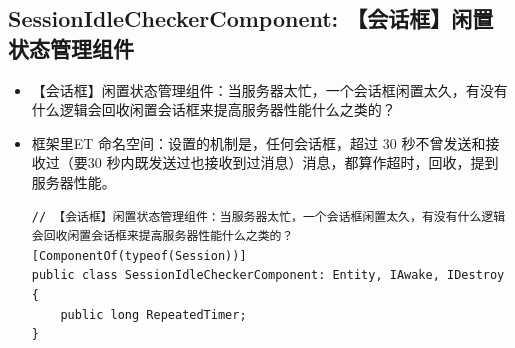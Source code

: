 \documentclass[9pt, b5paper]{article}
\begin{document}
\subsection{SessionIdleCheckerComponent: 【会话框】闲置状态管理组件}
\label{sec-3-16}
\begin{itemize}
\item 【会话框】闲置状态管理组件：当服务器太忙，一个会话框闲置太久，有没有什么逻辑会回收闲置会话框来提高服务器性能什么之类的？
\item 框架里ET 命名空间：设置的机制是，任何会话框，超过 30 秒不曾发送和接收过（要30 秒内既发送过也接收到过消息）消息，都算作超时，回收，提到服务器性能。
\begin{verbatim}
// 【会话框】闲置状态管理组件：当服务器太忙，一个会话框闲置太久，有没有什么逻辑会回收闲置会话框来提高服务器性能什么之类的？
[ComponentOf(typeof(Session))]
public class SessionIdleCheckerComponent: Entity, IAwake, IDestroy {
    public long RepeatedTimer;
}
\end{verbatim}
\end{itemize}
\end{document}
